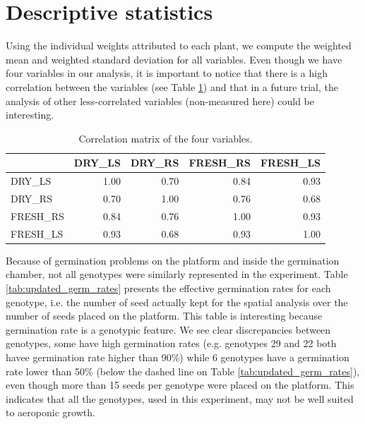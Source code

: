 \section{Descriptive statistics}

Using the individual weights attributed to each plant, we compute the weighted mean and weighted standard deviation for all variables. Even though we have four variables in our analysis, it is important to notice that there is a high correlation between the variables (see Table \ref{tab:var_correlation}) and that in a future trial, the analysis of other less-correlated variables (non-measured here) could be interesting.\\

\begin{table}[ht]
\centering
 \caption{Correlation matrix of the four variables.}
\begin{tabular}{lrrrr}
  \hline
 & DRY\_LS & DRY\_RS & FRESH\_RS & FRESH\_LS \\ 
  \hline
DRY\_LS & 1.00 & 0.70 & 0.84 & 0.93 \\ 
  DRY\_RS & 0.70 & 1.00 & 0.76 & 0.68 \\ 
  FRESH\_RS & 0.84 & 0.76 & 1.00 & 0.93 \\ 
  FRESH\_LS & 0.93 & 0.68 & 0.93 & 1.00 \\ 
   \hline
\end{tabular}
\label{tab:var_correlation}
\end{table}

Because of germination problems on the platform and inside the germination chamber, not all genotypes were similarly represented in the experiment. Table \ref{tab:updated_germ_rates} presents the effective germination rates for each genotype, i.e. the number of seed actually kept for the spatial analysis over the number of seeds placed on the platform. This table is interesting because germination rate is a genotypic feature. We see clear discrepancies between genotypes, some have high germination rates (e.g. genotypes 29 and 22 both havee germination rate higher than 90\%) while 6 genotypes have a germination rate lower than 50\% (below the dashed line on Table \ref{tab:updated_germ_rates}), even though more than 15 seeds per genotype were placed on the platform. This indicates that all the genotypes, used in this experiment, may not be well suited to aeroponic growth.\\

